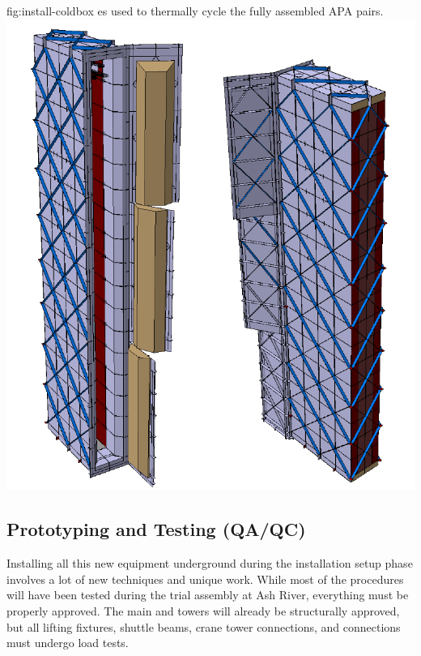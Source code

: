 \begin{dunefigure}{fig:install-coldbox}
  {\coldbox{}es used to thermally cycle the fully assembled APA pairs. }
\includegraphics[width=.5\textwidth]{graphics/install-coldbox.pdf}
\end{dunefigure}



\clearpage

\subsection{Prototyping and Testing (QA/QC)}
\label{sec:fdsp-tc-infr-qaqc}

Installing all this new equipment underground during the installation setup phase involves a lot of new techniques  and unique work. While most of the procedures will have been tested during the trial assembly at Ash River, everything must be properly approved. The main  and  towers will already be structurally approved, but all lifting fixtures, shuttle beams, crane tower connections, and \coldbox connections must undergo load tests. 

